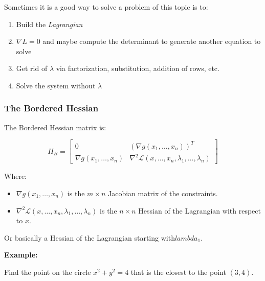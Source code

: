 Sometimes it is a good way to solve a problem of this topic is to:

\begin{enumerate}
    
    \item Build the \emph{Lagrangian}
    
    \item \(\nabla L = 0\) and maybe compute the determinant to generate another equation to solve
    
    
    \item Get rid of \(\lambda\) via factorization, substitution, addition of rows, etc.
    
    \item Solve the system without \(\lambda\)

\end{enumerate}

\subsubsection{The Bordered Hessian}

The Bordered Hessian matrix is:

\[
    H_B =
    \begin{bmatrix}
    0 & {\left( \nabla g(x_1, \dots, x_n) \right)}^T \\
    \nabla g(x_1, \dots, x_n) & \nabla^2 \mathcal{L}(x, \dots, x_n, \lambda_1, \dots, \lambda_n)
    \end{bmatrix}
\]

Where:

\begin{itemize}

    \item \( \nabla  g(x_1, \dots, x_n) \) is the \( m \times n \) Jacobian matrix of the constraints.

    \item \( \nabla^2 \mathcal{L}(x, \dots, x_n, \lambda_1, \dots, \lambda_n) \) is the \( n \times n \) Hessian of the Lagrangian with respect to \( x \).

\end{itemize}

Or basically a Hessian of the Lagrangian starting with\(lambda_1\).
\vspace{\baselineskip}

\textbf{Example:}
\vspace{\baselineskip}

Find the point on the circle \(x^2 + y^2 = 4\) that is the closest to the point \((3,4)\).
\vspace{\baselineskip}

